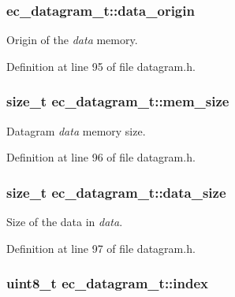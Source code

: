 \subsubsection[{data\-\_\-origin}]{ {\bf ec\-\_\-datagram\-\_\-t\-::data\-\_\-origin}}\label{structec__datagram__t_ae8d52c6dc3ef92d165d9d14cd9c3d593}


\-Origin of the {\itshape data\/} memory. 



\-Definition at line 95 of file datagram.\-h.

\subsubsection[{mem\-\_\-size}]{\setlength{\rightskip}{0pt plus 5cm}size\-\_\-t {\bf ec\-\_\-datagram\-\_\-t\-::mem\-\_\-size}}\label{structec__datagram__t_a038f0d3706ceb82a71a87644bb5cb987}


\-Datagram {\itshape data\/} memory size. 



\-Definition at line 96 of file datagram.\-h.

\subsubsection[{data\-\_\-size}]{\setlength{\rightskip}{0pt plus 5cm}size\-\_\-t {\bf ec\-\_\-datagram\-\_\-t\-::data\-\_\-size}}\label{structec__datagram__t_a2bdc1dfd68576466bfe3d276b9322959}


\-Size of the data in {\itshape data\/}. 



\-Definition at line 97 of file datagram.\-h.

\subsubsection[{index}]{\setlength{\rightskip}{0pt plus 5cm}uint8\-\_\-t {\bf ec\-\_\-datagram\-\_\-t\-::index}}\label{structec__datagram__t_a76cb4206efa88c4084db0b99c802d5b9}


